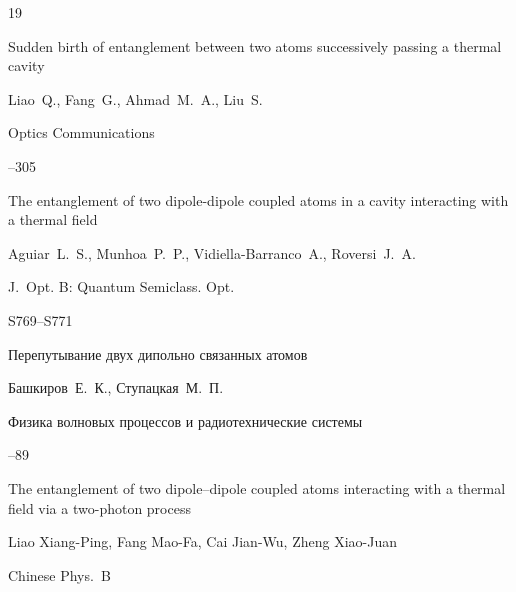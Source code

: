 \begin{thebibliography}{19}

\paper Sudden birth of entanglement between two atoms successively passing a thermal cavity

\by  Liao~Q., Fang~G., Ahmad~M.~A.,  Liu~S.

\jour Optics Communications




--305







\paper The entanglement of two dipole-dipole coupled atoms in a cavity interacting with a thermal field

\by   Aguiar~L.~S.,  Munhoa~P.~P.,  Vidiella-Barranco~A.,  Roversi~J.~A.

\jour J.~Opt. B: Quantum Semiclass. Opt. 




\pages S769--S771





\paper Перепутывание двух дипольно связанных атомов

\by Башкиров~Е.~К., Ступацкая~М.~П.

\jour Физика волновых процессов и радиотехнические системы




--89







\paper The entanglement of two dipole–dipole coupled atoms interacting with a thermal field via a two-photon process 

\by   Liao Xiang-Ping, Fang Mao-Fa, Cai Jian-Wu, Zheng Xiao-Juan

\jour Chinese Phys.~B



\end{thebibliography}
